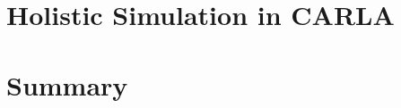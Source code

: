 \label{sec:5_decision_making}


\section{Holistic Simulation in CARLA}

\label{sec:5_simulation}

\section{Summary}
\label{sec:5_summary}